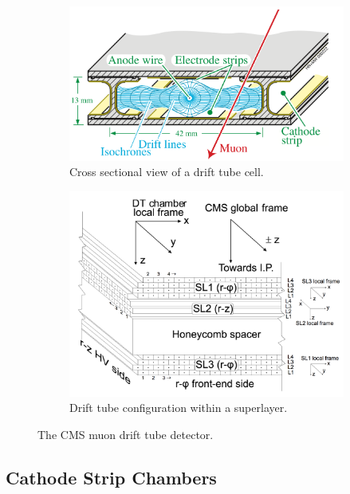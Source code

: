 \begin{figure}[hb!]
\centering
\begin{subfigure}[b]{0.475\textwidth}
\includegraphics[width=\textwidth]{figs/dtcell.png}
\caption{Cross sectional view of a drift tube cell.}
\end{subfigure}
\begin{subfigure}[b]{0.475\textwidth}
\includegraphics[width=\textwidth]{figs/superlayer.png}
\caption{Drift tube configuration within a superlayer.}
\end{subfigure}
\caption{The CMS muon drift tube detector.\cite{dtcellpic}}
\label{fig:superlayer}
\end{figure}

\subsection{Cathode Strip Chambers}

